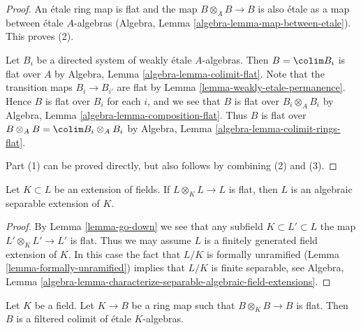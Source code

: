 \begin{proof}
An \'etale ring map is flat and the map $B \otimes_A B \to B$ is
also \'etale as a map between \'etale $A$-algebras
(Algebra, Lemma \ref{algebra-lemma-map-between-etale}).
This proves (2).

\medskip\noindent
Let $B_i$ be a directed system of weakly \'etale $A$-algebras.
Then $B = \colim B_i$ is flat over $A$ by
Algebra, Lemma \ref{algebra-lemma-colimit-flat}.
Note that the transition maps $B_i \to B_{i'}$ are flat
by Lemma \ref{lemma-weakly-etale-permanence}.
Hence $B$ is flat over $B_i$ for each $i$, and we see that $B$ is flat
over $B_i \otimes_A B_i$ by
Algebra, Lemma \ref{algebra-lemma-composition-flat}.
Thus $B$ is flat over $B \otimes_A B = \colim B_i \otimes_A B_i$
by Algebra, Lemma \ref{algebra-lemma-colimit-rings-flat}.

\medskip\noindent
Part (1) can be proved directly, but also follows by combining
(2) and (3).
\end{proof}

\begin{lemma}
\label{lemma-absolutely-flat-fields}
Let $K \subset L$ be an extension of fields. If $L \otimes_K L \to L$
is flat, then $L$ is an algebraic separable extension of $K$.
\end{lemma}

\begin{proof}
By Lemma \ref{lemma-go-down} we see that any subfield
$K \subset L' \subset L$ the map $L' \otimes_K L' \to L'$ is flat.
Thus we may assume $L$ is a finitely generated field extension of $K$.
In this case the fact that $L/K$ is formally unramified
(Lemma \ref{lemma-formally-unramified})
implies that $L/K$ is finite separable, see Algebra, Lemma
\ref{algebra-lemma-characterize-separable-algebraic-field-extensions}.
\end{proof}

\begin{lemma}
\label{lemma-absolutely-flat-over-field}
Let $K$ be a field. Let $K \to B$ be a ring map such that
$B \otimes_K B \to B$ is flat. Then $B$ is a filtered colimit of
\'etale $K$-algebras.
\end{lemma}

